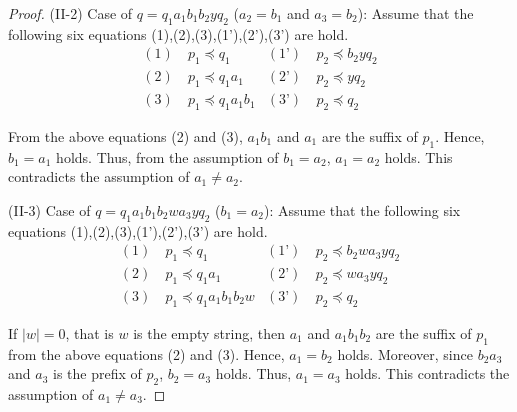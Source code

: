 \begin{proof}
\noindent
(II-2) Case of $q=q_{1}a_{1}b_{1}b_{2}yq_{2}$ ($a_{2}=b_{1}$ and $a_{3}=b_{2}$):
Assume that the following six equations (1),(2),(3),(1'),(2'),(3') are hold.
\begin{align*}
(1)~& p_{1} \preceq q_{1} & (\text{1'})~& p_{2} \preceq b_{2}yq_{2} \\
(2)~& p_{1} \preceq q_{1}a_{1} & (\text{2'})~& p_{2} \preceq yq_{2} \\
(3)~& p_{1} \preceq q_{1}a_{1}b_{1} & (\text{3'})~& p_{2} \preceq q_{2}
\end{align*}

\noindent
From the above equations (2) and (3), $a_{1}b_{1}$ and $a_{1}$ are the suffix of $p_{1}$.
Hence, $b_{1}=a_{1}$ holds.
Thus, from the assumption of $b_{1}=a_{2}$, $a_{1}=a_{2}$ holds.
This contradicts the assumption of $a_{1} \ne a_{2}$.
\smallskip

\noindent
(II-3) Case of $q=q_{1}a_{1}b_{1}b_{2}wa_{3}yq_{2}$ ($b_{1}=a_{2}$):
Assume that the following six equations (1),(2),(3),(1'),(2'),(3') are hold.
\begin{align*}
(1)~& p_{1} \preceq q_{1} & (\text{1'})~& p_{2} \preceq b_{2}wa_{3}yq_{2} \\
(2)~& p_{1} \preceq q_{1}a_{1} & (\text{2'})~& p_{2} \preceq wa_{3}yq_{2} \\
(3)~& p_{1} \preceq q_{1}a_{1}b_{1}b_{2}w & (\text{3'})~& p_{2} \preceq q_{2}
\end{align*}

\noindent
If $|w|=0$, that is $w$ is the empty string, then $a_{1}$ and $a_{1}b_{1}b_{2}$ are the suffix of $p_{1}$ from the above equations (2) and (3).
Hence, $a_{1}=b_{2}$ holds.
Moreover, since $b_{2}a_{3}$ and $a_{3}$ is the prefix of $p_{2}$, $b_{2}=a_{3}$ holds.
Thus, $a_{1}=a_{3}$ holds.
This contradicts the assumption of $a_{1} \ne a_{3}$.


\end{proof}
